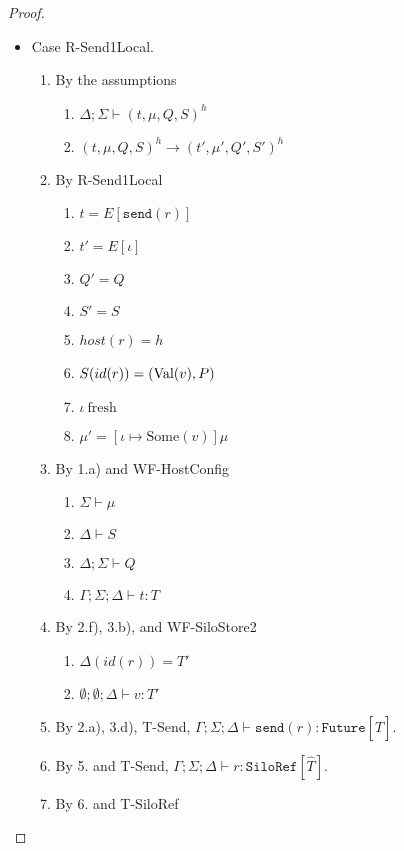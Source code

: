 \begin{proof}
\begin{itemize}
\item Case R-Send1Local.
\begin{enumerate}
\item By the assumptions
  \begin{enumerate}[label=(\alph*)]
  \item $\Delta ; \Sigma \vdash (t, \mu, Q, S)^h$
  \item $(t, \mu, Q, S)^h \longrightarrow (t', \mu', Q', S')^h$
  \end{enumerate}
\item By R-Send1Local
  \begin{enumerate}[label=(\alph*)]
  \item $t = E[\texttt{send}(r)]$
  \item $t' = E[\iota]$
  \item $Q' = Q$
  \item $S' = S$
  \item $host(r) = h$
  \item $S(id(r)) = ({\textrm{Val}(v)}, P)$  %
  \item $\iota~\text{fresh}$
  \item $\mu' = [\iota \mapsto \text{Some}(v)]\mu$  %
  \end{enumerate}
\item By 1.a) and WF-HostConfig
  \begin{enumerate}[label=(\alph*)]
  \item $\Sigma \vdash \mu$
  \item $\Delta \vdash S$
  \item $\Delta ; \Sigma \vdash Q$
  \item $\Gamma ; \Sigma ; \Delta \vdash t : T$
  \end{enumerate}
\item By 2.f), 3.b), and WF-SiloStore2
  \begin{enumerate}[label=(\alph*)]
  \item $\Delta(id(r)) = T'$
  \item $\emptyset ; \emptyset ; \Delta \vdash v : T'$
  \end{enumerate}
\item By 2.a), 3.d), T-Send, $\Gamma ; \Sigma ; \Delta \vdash \texttt{send}(r) : \texttt{Future}[\hat{T}]$.
\item By 5. and T-Send, $\Gamma ; \Sigma ; \Delta \vdash r : \texttt{SiloRef}[\hat{T}]$.
\item By 6. and T-SiloRef
  \begin{enumerate}[label=(\alph*)]

\end{enumerate}
\end{enumerate}
\end{itemize}
\end{proof}
